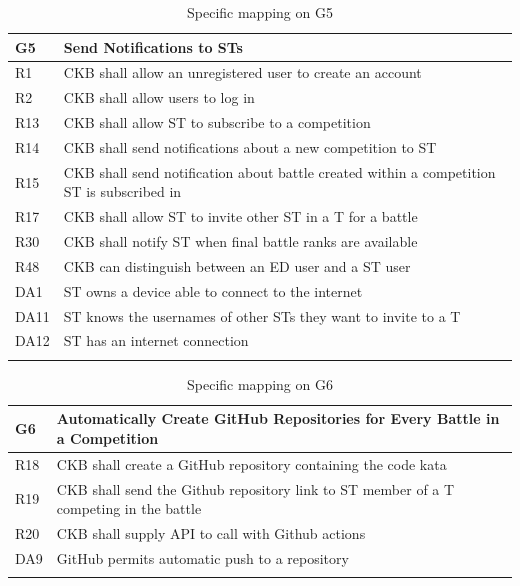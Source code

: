   \begin{longtable}{|l|p{12cm}|}
    \hline
    \textbf{G5} & \textbf{Send Notifications to STs}      \\
    \hline
    R1 & CKB shall allow an unregistered user to create an account \\
    \hline
    R2 & CKB shall allow users to log in \\
    \hline
    R13 & CKB shall allow ST to subscribe to a competition \\
    \hline
    R14 & CKB shall send notifications about a new competition to ST \\
    \hline
    R15 & CKB shall send notification about battle created within a competition ST is subscribed in \\
    \hline
    R17 & CKB shall allow ST to invite other ST in a T for a battle \\
    \hline
    R30 & CKB shall notify ST when final battle ranks are available \\
    \hline
    R48 & CKB can distinguish between an ED user and a ST user \\
    \hline
    DA1 & ST owns a device able to connect to the internet \\
    \hline
    DA11 & ST knows the usernames of other STs they want to invite to a T \\
    \hline
    DA12 & ST has an internet connection \\
    \hline

    \caption{Specific mapping on G5}
    \label{tab:mappingG5}
  \end{longtable}

  \begin{longtable}{|l|p{12cm}|}
    \hline
    \textbf{G6} & \textbf{Automatically Create GitHub Repositories for Every Battle in a Competition}      \\
    \hline
    R18 & CKB shall create a GitHub repository containing the code kata \\
    \hline
    R19 & CKB shall send the Github repository link to ST member of a T competing in the battle \\
    \hline
    R20 & CKB shall supply API to call with Github actions \\
    \hline
    DA9 & GitHub permits automatic push to a repository \\
    \hline

    \caption{Specific mapping on G6}
    \label{tab:mappingG6}
  \end{longtable}
  
